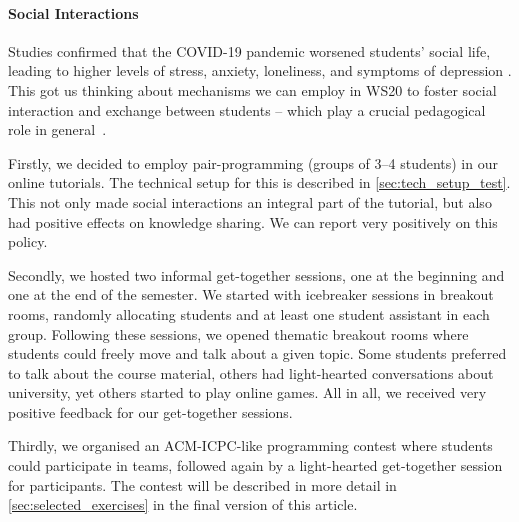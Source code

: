 \paragraph{Social Interactions}
Studies confirmed that the COVID-19 pandemic
worsened students' social life,
leading to higher levels of stress, anxiety, loneliness, and symptoms of depression \cite{students_lockdown1}.
This got us thinking about mechanisms we
can employ in WS20 to foster social interaction and exchange between students
-- which play a crucial pedagogical role in general~\cite{impact_social_interaction}.

Firstly, we decided to employ pair-programming (groups of 3--4 students)
in our online tutorials.
The technical setup for this is described in \cref{sec:tech_setup_test}.
This not only made social interactions an integral part of the tutorial,
but also had positive effects on knowledge sharing.
We can report very positively on this policy.

Secondly, we hosted two informal get-together sessions,
one at the beginning and one at the end of the semester.
We started with icebreaker sessions in breakout rooms,
randomly allocating students and at least one student assistant in each group.
Following these sessions,
we opened thematic breakout rooms where students
could freely move and talk about a given topic.
Some students preferred to talk about the course material, others had
light-hearted conversations about university, yet others started to play online games.
All in all, we received very positive feedback for our get-together sessions.

Thirdly, we organised an
ACM-ICPC-like programming contest
where students could participate in teams,
followed again by a light-hearted get-together session
for participants.
The contest will be described in more detail in \cref{sec:selected_exercises} in the final version of this article.

